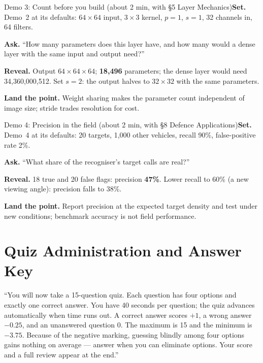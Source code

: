 \documentclass[11pt]{article}
\begin{document}
\begin{live}{Demo 3: Count before you build (about 2 min, with \S5 Layer Mechanics)}\textbf{Set.} Demo~2 at its defaults: $64\times64$ input, $3\times3$ kernel, $p=1$, $s=1$, 32 channels in, 64 filters.\par\smallskip\textbf{Ask.} ``How many parameters does this layer have, and how many would a dense layer with the same input and output need?''\par\smallskip\textbf{Reveal.} Output $64\times64\times64$; \textbf{18,496} parameters; the dense layer would need 34,360,000,512. Set $s=2$: the output halves to $32\times32$ with the same parameters.\par\smallskip\textbf{Land the point.} Weight sharing makes the parameter count independent of image size; stride trades resolution for cost.\end{live}

\begin{live}{Demo 4: Precision in the field (about 2 min, with \S8 Defence Applications)}\textbf{Set.} Demo~4 at its defaults: 20 targets, 1,000 other vehicles, recall 90\%, false-positive rate 2\%.\par\smallskip\textbf{Ask.} ``What share of the recogniser's target calls are real?''\par\smallskip\textbf{Reveal.} 18 true and 20 false flags: precision \textbf{47\%}. Lower recall to 60\% (a new viewing angle): precision falls to 38\%.\par\smallskip\textbf{Land the point.} Report precision at the expected target density and test under new conditions; benchmark accuracy is not field performance.\end{live}

\section{Quiz Administration and Answer Key}

\begin{sayit}``You will now take a 15-question quiz. Each question has four options and exactly one correct answer. You have 40 seconds per question; the quiz advances automatically when time runs out. A correct answer scores $+1$, a wrong answer $-0.25$, and an unanswered question 0. The maximum is 15 and the minimum is $-3.75$. Because of the negative marking, guessing blindly among four options gains nothing on average --- answer when you can eliminate options. Your score and a full review appear at the end.''\end{sayit}
\end{document}
